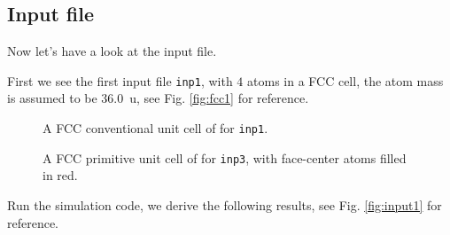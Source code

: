 
\subsection{Input file}

Now let's have a look at the input file.

First we see the first input file \texttt{inp1}, with $4$  atoms in a FCC cell,
the atom mass is assumed to be \SI{36.0}{\atomicmassunit},
see Fig. \ref{fig:fcc1} for reference.

\begin{figure}[H]
  \begin{minipage}{0.48\textwidth}
    \centering
    
    \caption{A FCC conventional unit cell of  for \texttt{inp1}.}
    \label{fig:fcc1}
  \end{minipage}
\hfill
  \begin {minipage}{0.48\textwidth}
  \centering
  
  \caption{A FCC primitive unit cell of  for \texttt{inp3}, with
  face-center atoms filled in red.}
  \label{fig:fcc3}
\end{minipage}
\end{figure}

Run the simulation code, we derive the following results,
see Fig. \ref{fig:input1} for reference.


